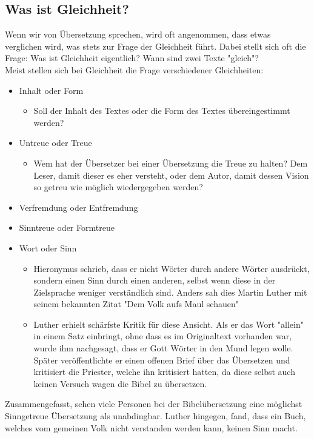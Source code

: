 \documentclass{article}
\begin{document}
	\subsection{Was ist Gleichheit?}
	Wenn wir von Übersetzung sprechen, wird oft angenommen, dass etwas verglichen wird, was stets zur Frage der Gleichheit führt. Dabei stellt sich oft die Frage: Was ist Gleichheit eigentlich? Wann sind zwei Texte "gleich"? \\
	Meist stellen sich bei Gleichheit die Frage verschiedener Gleichheiten:
	\begin{itemize}
		\item{Inhalt oder Form}
		\begin{itemize}
			\item{Soll der Inhalt des Textes oder die Form des Textes übereingestimmt werden? }
		\end{itemize}
		\item{Untreue oder Treue}
		\begin{itemize}
			\item{Wem hat der Übersetzer bei einer Übersetzung die Treue zu halten? Dem Leser, damit dieser es eher versteht, oder dem Autor, damit dessen Vision so getreu wie möglich wiedergegeben werden?}
		\end{itemize}
		\item{Verfremdung oder Entfremdung}
		\item{Sinntreue oder Formtreue}
		\item{Wort oder Sinn}
		\begin{itemize}
			\item{Hieronymus schrieb, dass er nicht Wörter durch andere Wörter ausdrückt, sondern einen Sinn durch einen anderen, selbst wenn diese in der Zielsprache weniger verständlich sind. Anders sah dies Martin Luther mit seinem bekannten Zitat "Dem Volk aufs Maul schauen"}
			\item{Luther erhielt schärfste Kritik für diese Ansicht. Als er das Wort "allein" in einem Satz einbringt, ohne dass es im Originaltext vorhanden war, wurde ihm nachgesagt, dass er Gott Wörter in den Mund legen wolle. Später veröffentlichte er einen offenen Brief über das Übersetzen und kritisiert die Priester, welche ihn kritisiert hatten, da diese selbst auch keinen Versuch wagen die Bibel zu übersetzen.}
		\end{itemize}
	\end{itemize}
	Zusammengefasst, sehen viele Personen bei der Bibelübersetzung eine möglichst Sinngetreue Übersetzung als unabdingbar. Luther hingegen, fand, dass ein Buch, welches vom gemeinen Volk nicht verstanden werden kann, keinen Sinn macht. \\
\end{document}
